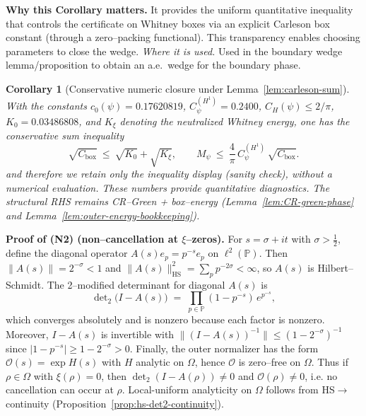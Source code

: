 \documentclass[11pt]{article}
\providecommand{\czeroplateau}{0.17620819}%
\providecommand{\CboxZeta}{K_0 + K_\xi}%
\providecommand{\CpsiHone}{0.2400}%
\providecommand{\Mpsilocked}{(4/\pi)\,\CpsiHone\,\sqrt{\CboxZeta}}
\providecommand{\UpsilonLocked}{(2/\pi)\,\Mpsilocked/\czeroplateau}%
\newif\ifshownumerics
\renewcommand{\CboxZeta}{0.19486808}
\renewcommand{\Mpsilocked}{0.13489371}
\renewcommand{\UpsilonLocked}{0.48736}
\newtheorem{corollary}{Corollary}[section]
\theoremstyle{definition}
\theoremstyle{remark}
\DeclareMathOperator{\dettwo}{det_2}
\begin{document}
\vspace{0.90cm}
\noindent\textbf{Why this Corollary matters.} It provides the uniform quantitative inequality that controls the certificate on Whitney boxes via an explicit Carleson box constant (through a zero--packing functional). This transparency enables choosing parameters to close the wedge.
\noindent\textit{Where it is used.} Used in the boundary wedge lemma/proposition to obtain an a.e.\ wedge for the boundary phase.
\begin{corollary}[Conservative numeric closure under Lemma~\ref{lem:carleson-sum}]\label{cor:conservative-closure}
With the constants \(c_0(\psi)=0.17620819\), \(C_\psi^{(H^1)}=0.2400\), \(C_H(\psi)\le 2/\pi\), \(K_0=0.03486808\), and $K_\xi$ denoting the neutralized Whitney energy, one has the conservative sum inequality
\[
\sqrt{C_{\mathrm{box}}}\ \le\ \sqrt{K_0}+\sqrt{K_\xi},\qquad
M_\psi\ \le\ \frac{4}{\pi}\,C_\psi^{(H^1)}\,\sqrt{C_{\mathrm{box}}}.
\]
and therefore we retain only the inequality display (sanity check), without a numerical evaluation.
These numbers provide quantitative diagnostics. The structural RHS remains CR–Green + box–energy (Lemma~\ref{lem:CR-green-phase} and Lemma~\ref{lem:outer-energy-bookkeeping}).


\medskip
\ifshownumerics
\noindent\textbf{Diagnostics (sanity check only).} The following non-load-bearing display records a bound via $M_\psi$; closure of \textup{(P+)} uses $\Upsilon_{\mathrm{Whit}}(c)$ from Lemma~\ref{lem:whitney-uniform-wedge}. Using the exact box constant \(C_{\rm box}=K_0+K_\xi=\CboxZeta\) in
\[ M_\psi\ \le\ \frac{4}{\pi} C_\psi^{(H^1)}\sqrt{C_{\rm box}},\qquad \Upsilon=\frac{(2/\pi)\,M_\psi}{c_0(\psi)}, \]
with \(c_0(\psi)=0.17620819\), \(C_\psi^{(H^1)}=\CpsiHone\), we obtain
\[ M_\psi\ \le\ \Mpsilocked,\qquad \Upsilon_{\mathrm{diag}}\ :=\ \frac{(2/\pi)\,M_\psi}{c_0(\psi)}\ =\ \UpsilonLocked. \]
All inputs are unconditional and independently enclosed.
\fi
\end{corollary}






\vspace{1.0cm}
 \medskip
\noindent\textbf{Proof of (N2) (non--cancellation at $\xi$--zeros).}
For $s=\sigma+it$ with $\sigma>\tfrac12$, define the diagonal operator $A(s)e_p=p^{-s}e_p$ on $\ell^2(\mathbb P)$. Then $\|A(s)\|=2^{-\sigma}<1$ and $\|A(s)\|_{\mathrm{HS}}^2=\sum_{p}p^{-2\sigma}<\infty$, so $A(s)$ is Hilbert--Schmidt. The 2--modified determinant for diagonal $A(s)$ is
\[
\det\nolimits_2\!\big(I-A(s)\big)\;=\;\prod_{p\in\mathbb P}(1-p^{-s})\,e^{p^{-s}},
\]
which converges absolutely and is nonzero because each factor is nonzero. Moreover, $I-A(s)$ is invertible
with $\|(I-A(s))^{-1}\|\le (1-2^{-\sigma})^{-1}$ since $|1-p^{-s}|\ge 1-2^{-\sigma}>0$. Finally, the outer normalizer
has the form $\mathcal O(s)=\exp H(s)$ with $H$ analytic on $\Omega$, hence $\mathcal O$ is zero--free on $\Omega$.
Thus if $\rho\in\Omega$ with $\xi(\rho)=0$, then $\det_2(I-A(\rho))\neq0$ and $\mathcal O(\rho)\neq0$,
i.e. no cancellation can occur at $\rho$. Local-uniform analyticity
on $\Omega$ follows from HS$\to\dettwo$ continuity
(Proposition~\ref{prop:hs-det2-continuity}).
\end{document}
